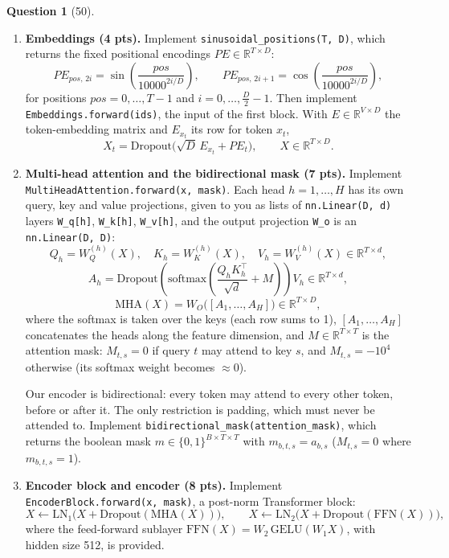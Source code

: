 \documentclass[12pt]{article}
\theoremstyle{definition}
\newtheorem{exercise}{Question}%
\begin{document}
\begin{exercise}[50]
\begin{enumerate}
  \item \textbf{Embeddings (4 pts).} Implement \texttt{sinusoidal\_positions(T, D)}, which returns the fixed
  positional encodings $PE \in \mathbb{R}^{T \times D}$:
  \[
    PE_{pos,\,2i} = \sin\!\left(\frac{pos}{10000^{2i/D}}\right), \qquad
    PE_{pos,\,2i+1} = \cos\!\left(\frac{pos}{10000^{2i/D}}\right),
  \]
  for positions $pos = 0, \dots, T-1$ and $i = 0, \dots, \tfrac{D}{2}-1$.
  Then implement \texttt{Embeddings.forward(ids)}, the input of the first block. With $E \in \mathbb{R}^{V \times D}$
  the token-embedding matrix and $E_{x_t}$ its row for token $x_t$,
  \[
    X_t = \mathrm{Dropout}\big(\sqrt{D}\, E_{x_t} + PE_t\big), \qquad X \in \mathbb{R}^{T \times D}.
  \]

  \item \textbf{Multi-head attention and the bidirectional mask (7 pts).} Implement
  \texttt{MultiHeadAttention.forward(x, mask)}. Each head
  $h = 1, \dots, H$ has its own query, key and value projections, given to you as lists of \texttt{nn.Linear(D, d)}
  layers \texttt{W\_q[h]}, \texttt{W\_k[h]}, \texttt{W\_v[h]}, and the output projection
  \texttt{W\_o} is an \texttt{nn.Linear(D, D)}:
  \[
    Q_h = W_Q^{(h)}(X), \quad K_h = W_K^{(h)}(X), \quad V_h = W_V^{(h)}(X) \in \mathbb{R}^{T \times d},
  \]
  \[
    A_h = \mathrm{Dropout}\!\left(\mathrm{softmax}\!\left(\frac{Q_h K_h^\top}{\sqrt{d}} + M\right)\right) V_h
    \in \mathbb{R}^{T \times d},
  \]
  \[
    \mathrm{MHA}(X) = W_O\big([A_1, \dots, A_H]\big) \in \mathbb{R}^{T \times D},
  \]
  where the softmax is taken over the keys (each row sums to 1), $[A_1, \dots, A_H]$ concatenates the heads along
  the feature dimension, and $M \in \mathbb{R}^{T \times T}$ is the attention mask: $M_{t,s} = 0$ if query $t$ may
  attend to key $s$, and $M_{t,s} = -10^4$ otherwise (its softmax weight becomes $\approx 0$).


  Our encoder is bidirectional: every
  token may attend to every other token, before or after it. The only restriction is padding, which must never be
  attended to. Implement
  \texttt{bidirectional\_mask(attention\_mask)}, which returns the boolean mask
  $m \in \{0, 1\}^{B \times T \times T}$ with $m_{b,t,s} = a_{b,s}$ ($M_{t,s} = 0$ where $m_{b,t,s} = 1$).

  \item \textbf{Encoder block and encoder (8 pts).} Implement \texttt{EncoderBlock.forward(x, mask)}, a post-norm Transformer
  block:
  \[
    X \leftarrow \mathrm{LN}_1\big(X + \mathrm{Dropout}(\mathrm{MHA}(X))\big), \qquad
    X \leftarrow \mathrm{LN}_2\big(X + \mathrm{Dropout}(\mathrm{FFN}(X))\big),
  \]
  where the feed-forward sublayer $\mathrm{FFN}(X) = W_2\, \mathrm{GELU}(W_1 X)$, with hidden size 512, is provided.



\end{enumerate}
\end{exercise}
\end{document}
